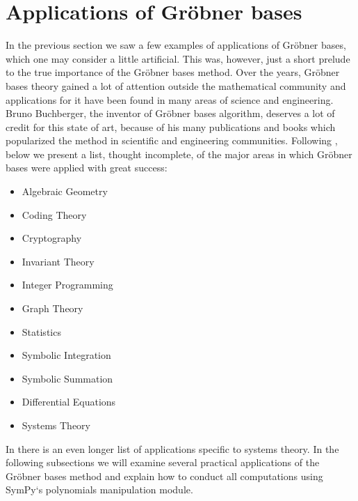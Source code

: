 \section{Applications of Gröbner bases}

In the previous section we saw a few examples of applications of Gröbner bases, which one may
consider a little artificial. This was, however, just a short prelude to the true importance of
the Gröbner bases method. Over the years, Gröbner bases theory gained a lot of attention
outside the mathematical community and applications for it have been found in many areas of science
and engineering. Bruno Buchberger, the inventor of Gröbner bases algorithm, deserves a lot of
credit for this state of art, because of his many publications and books which popularized the method
in scientific and engineering communities. Following \cite{Buchberger1998applications}, below we present
a list, thought incomplete, of the major areas in which Gröbner bases were applied with great success:
\begin{itemize}
\item {} 
Algebraic Geometry

\item {} 
Coding Theory

\item {} 
Cryptography

\item {} 
Invariant Theory

\item {} 
Integer Programming

\item {} 
Graph Theory

\item {} 
Statistics

\item {} 
Symbolic Integration

\item {} 
Symbolic Summation

\item {} 
Differential Equations

\item {} 
Systems Theory

\end{itemize}

In \cite{Buchberger2001systems} there is an even longer list of applications specific to systems theory.
In the following subsections we will examine several practical applications of the Gröbner bases
method and explain how to conduct all computations using SymPy`s polynomials manipulation module.



